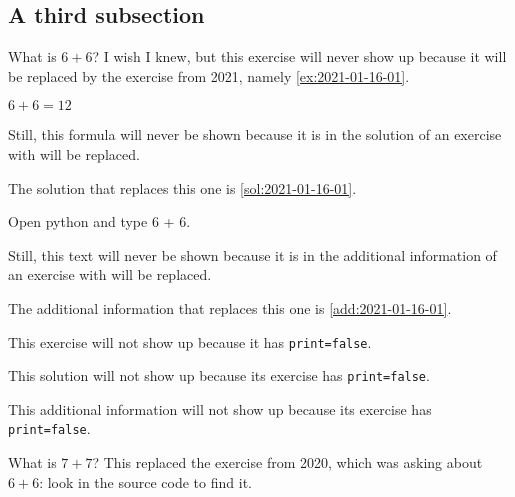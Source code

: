\documentclass[oneside]{book}
\begin{document}
\subsection{A third subsection}

\begin{exercise}[examdate={January 16, 2020}, examproblemnumber={1}, examproblemid={2020-01-16-01}, replacedbyexamproblemid={2021-01-16-01}, replacementsinceacademicyear={2025/2026}]
  What is \(6 + 6\)? I wish I knew, but this exercise will never show up because it will be replaced by the exercise from 2021, namely \cref{ex:2021-01-16-01}.
\end{exercise}

\begin{solution}
  \(6 + 6 = 12\)

Still, this formula will never be shown because it is in the solution of an exercise with will be replaced.

The solution that replaces this one is \cref{sol:2021-01-16-01}.
\end{solution}

\begin{additionalinformation}
Open python and type 6 + 6.

Still, this text will never be shown because it is in the additional information of an exercise with will be replaced.

The additional information that replaces this one is \cref{add:2021-01-16-01}.
\end{additionalinformation}

\begin{exercise}[print=false]
This exercise will not show up because it has \texttt{print=false}.
\end{exercise}

\begin{solution}
This solution will not show up because its exercise has \texttt{print=false}.
\end{solution}

\begin{additionalinformation}
This additional information will not show up because its exercise has \texttt{print=false}.
\end{additionalinformation}

\begin{exercise}[examdate={January 16, 2021}, examproblemnumber={1}, examproblemid={2021-01-16-01}]
  What is \(7 + 7\)? This replaced the exercise from 2020, which was asking about \(6 + 6\): look in the source code to find it.
\end{exercise}
\end{document}
